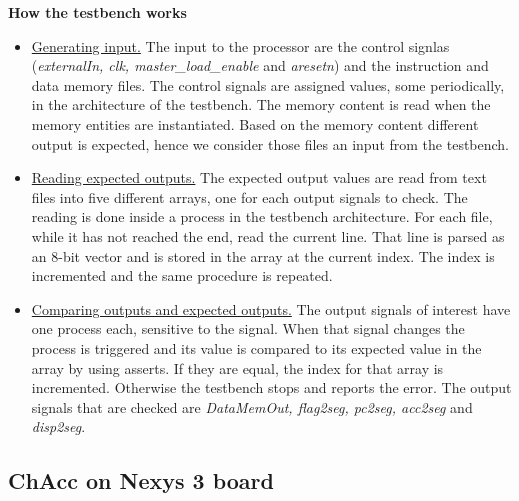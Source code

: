 \documentclass[a4paper,11pt]{article}
\begin{document}
\textbf{How the testbench works}
\begin{itemize}
  \item \underline{Generating input.} The input to the processor are the control signlas (\textit{externalIn, clk, master\_load\_enable} and \textit{aresetn}) and the instruction and data memory files. The control signals are assigned values, some periodically,  in the architecture of the testbench. The memory content is read when the memory entities are instantiated. Based on the memory content different output is expected, hence we consider those files an input from the testbench.
  \item \underline{Reading expected outputs.} The expected output values are read from text files into five different arrays, one for each output signals to check. The reading is done inside a process in the testbench architecture. For each file, while it has not reached the end, read the current line. That line is parsed as an 8-bit vector and is stored in the array at the current index. The index is incremented and the same procedure is repeated.
  \item \underline{Comparing outputs and expected outputs.} The output signals of interest have one process each, sensitive to the signal. When that signal changes the process is triggered and its value is compared to its expected value in the array by using asserts. If they are equal, the index for that array is incremented. Otherwise the testbench stops and reports the error. The output signals that are checked are \textit{DataMemOut, flag2seg, pc2seg, acc2seg} and \textit{disp2seg}.
\end{itemize}

\newpage
\subsection{ChAcc on Nexys 3 board}
\end{document}
